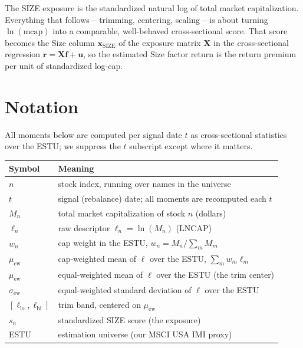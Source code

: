 \documentclass[11pt]{article}
\theoremstyle{definition}
\theoremstyle{plain}
\theoremstyle{remark}
\newcommand{\Xmat}{\mathbf{X}}
\newcommand{\fvec}{\mathbf{f}}
\begin{document}
\begin{keyresult}
The SIZE exposure is the standardized natural log of total market capitalization. Everything that follows -- trimming, centering, scaling -- is about turning $\ln(\text{mcap})$ into a comparable, well-behaved cross-sectional score. That score becomes the Size column $\mathbf{x}_{\mathrm{SIZE}}$ of the exposure matrix $\Xmat$ in the cross-sectional regression $\mathbf{r}=\Xmat\fvec+\mathbf{u}$, so the estimated Size factor return is the return premium per unit of standardized log-cap.
\end{keyresult}

\section*{Notation}

All moments below are computed per signal date $t$ as cross-sectional statistics over the ESTU; we suppress the $t$ subscript except where it matters.

\begin{center}
\begin{tabular}{ll}
\toprule
Symbol & Meaning \\
\midrule
$n$ & stock index, running over names in the universe \\
$t$ & signal (rebalance) date; all moments are recomputed each $t$ \\
$M_n$ & total market capitalization of stock $n$ (dollars) \\
$\ell_n$ & raw descriptor $\ell_n = \ln(M_n)$ (LNCAP) \\
$w_n$ & cap weight in the ESTU, $w_n = M_n / \sum_m M_m$ \\
$\mu_{\mathrm{cw}}$ & cap-weighted mean of $\ell$ over the ESTU, $\sum_m w_m \ell_m$ \\
$\mu_{\mathrm{ew}}$ & equal-weighted mean of $\ell$ over the ESTU (the trim center) \\
$\sigma_{\mathrm{ew}}$ & equal-weighted standard deviation of $\ell$ over the ESTU \\
$[\ell_{\mathrm{lo}},\ell_{\mathrm{hi}}]$ & trim band, centered on $\mu_{\mathrm{ew}}$ \\
$s_n$ & standardized SIZE score (the exposure) \\
ESTU & estimation universe (our MSCI USA IMI proxy) \\
\bottomrule
\end{tabular}
\end{center}
\end{document}
